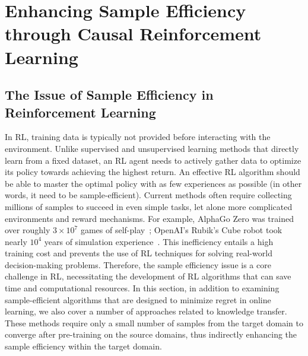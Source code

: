 \documentclass[10pt]{article} %
\theoremstyle{definition}
\begin{document}
%
%
\section{Enhancing Sample Efficiency through Causal Reinforcement Learning}
\label{sec:5inefficiency}

\subsection{The Issue of Sample Efficiency in Reinforcement Learning}

In RL, training data is typically not provided before interacting with the environment. 
Unlike supervised and unsupervised learning methods that directly learn from a fixed dataset, an RL agent needs to actively gather data to optimize its policy towards achieving the highest return. 
An effective RL algorithm should be able to master the optimal policy with as few experiences as possible (in other words, it need to be sample-efficient). 
Current methods often require collecting millions of samples to succeed in even simple tasks, let alone more complicated environments and reward mechanisms. 
For example, AlphaGo Zero was trained over roughly $3 \times 10^7$ games of self-play~\citep{silverMasteringGameGo2017a}; OpenAI's Rubik's Cube robot took nearly $10^4$ years of simulation experience~\citep{openaiSolvingRubikCube2019}. This inefficiency entails a high training cost and prevents the use of RL techniques for solving real-world decision-making problems. 
Therefore, the sample efficiency issue is a core challenge in RL, necessitating the development of RL algorithms that can save time and computational resources. 
In this section, in addition to examining sample-efficient algorithms that are designed to minimize regret in online learning, we also cover a number of approaches related to knowledge transfer. These methods require only a small number of samples from the target domain to converge after pre-training on the source domains, thus indirectly enhancing the sample efficiency within the target domain.
\end{document}
